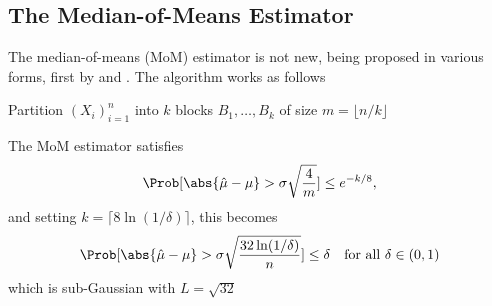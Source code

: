 \subsection{The Median-of-Means Estimator}
The median-of-means (MoM) estimator is not new, being proposed in various forms, first by \cite{nemirovskij1983problem} and \cite{jerrum1986random}. The algorithm works as follows

\begin{algorithm}[H]
\caption{Median-of-Means Estimator}

Partition $(X_i)_{i=1}^{n}$ into $k$ blocks $B_1, \dots, B_k$ of size $m = \lfloor n/k \rfloor$\;


\;
\end{algorithm}

The MoM estimator satisfies
\[
    \Prob[\abs{\hat{\mu} - \mu} > \sigma\sqrt{\frac{4}{m}}] \leq e^{-k/8},
\]
and setting $k = \lceil 8\ln(1/\delta) \rceil$, this becomes
\begin{equation}
    \Prob[\abs{\hat{\mu} - \mu} > \sigma\sqrt{\frac{32\ln(1/\delta)}{n}}] \leq \delta 
    \quad \text{for all } \delta \in (0,1)
\end{equation}
which is sub-Gaussian with $L = \sqrt{32}$